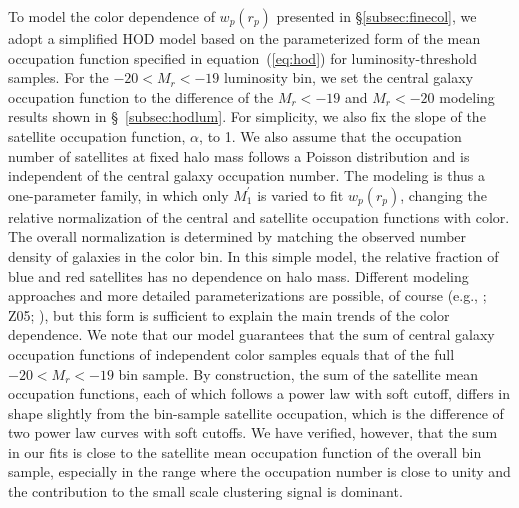 \documentclass[]{emulateapj}
\newcommand{\wrp}{{w_p(r_p)}}
\begin{document}
To model the color dependence of $\wrp$ presented in \S\ref{subsec:finecol},
we adopt a simplified HOD model based on the parameterized form of the mean
occupation function specified in equation~(\ref{eq:hod}) for 
luminosity-threshold samples. For the $-20<M_r<-19$ luminosity bin, we set 
the central galaxy occupation function to the difference of the 
$M_r<-19$ and $M_r<-20$ modeling results shown in \S~\ref{subsec:hodlum}.   
For simplicity, we also fix the slope of the satellite occupation function, 
$\alpha$, to 1. We also assume that the occupation number of satellites at 
fixed halo mass follows a Poisson distribution and is independent of the 
central galaxy occupation number. The modeling is thus a one-parameter family, 
in which only $M_1^\prime$ is varied to fit $\wrp$, changing the relative 
normalization of the central and satellite occupation functions with color. 
The overall normalization is determined
by matching the observed number density of galaxies in the color bin.
In this simple model, the relative fraction of blue and red satellites has
no dependence on halo mass. Different modeling approaches and more detailed 
parameterizations are possible, of course (e.g., 
\citealt{scranton02,cooray05}; Z05; \citealt{ross09,simon09,skibbasheth09}),
but this form is sufficient to explain the main trends of the color
dependence. 
We note that our model guarantees that the sum of central galaxy occupation
functions of independent color samples equals that of the full $-20<M_r<-19$ 
bin sample. By construction, the sum of the satellite mean occupation 
functions, each of which follows a power law with soft cutoff, 
differs in shape slightly from the bin-sample satellite occupation,
which is the difference of two power law curves with soft 
cutoffs. We have verified, however, that the sum in our fits
is close to the satellite mean 
occupation function of the overall bin sample, especially in the range where 
the occupation number is close to unity and the contribution to the small 
scale clustering signal is dominant.
\end{document}
